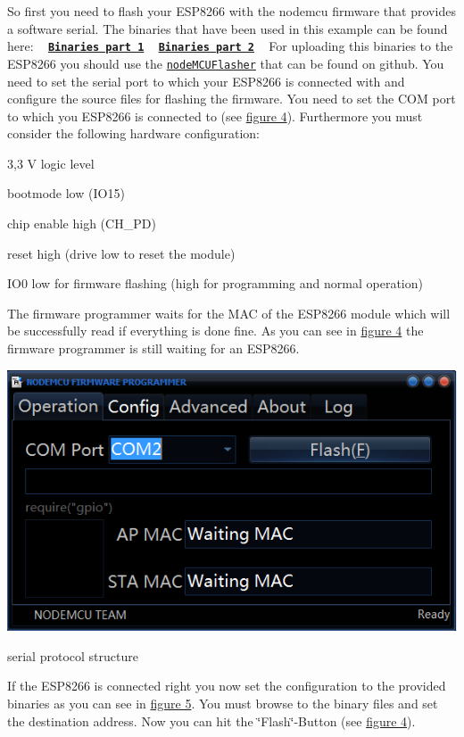  So first you need to flash your E\+S\+P8266 with the nodemcu firmware that provides a software serial. The binaries that have been used in this example can be found here\+: ~\newline
 \href{0x00000.bin}{\tt {\bfseries Binaries part 1}} ~\newline
 \href{0x10000.bin}{\tt {\bfseries Binaries part 2}} ~\newline
 For uploading this binaries to the E\+S\+P8266 you should use the \href{https://github.com/nodemcu/nodemcu-flasher}{\tt node\+M\+C\+U\+Flasher} that can be found on github. You need to set the serial port to which your E\+S\+P8266 is connected with and configure the source files for flashing the firmware. You need to set the C\+O\+M port to which you E\+S\+P8266 is connected to (see \hyperlink{index_four}{figure 4}). Furthermore you must consider the following hardware configuration\+: 
\begin{DoxyItemize}
\item 3,3 V logic level 
\item bootmode low (I\+O15) 
\item chip enable high (C\+H\+\_\+\+P\+D) 
\item reset high (drive low to reset the module) 
\item I\+O0 low for firmware flashing (high for programming and normal operation) 
\end{DoxyItemize}The firmware programmer waits for the M\+A\+C of the E\+S\+P8266 module which will be successfully read if everything is done fine. As you can see in \hyperlink{index_four}{figure 4} the firmware programmer is still waiting for an E\+S\+P8266. \label{index_four}%
\hypertarget{index_four}{}%

\begin{DoxyImage}
\includegraphics[width=\textwidth,height=\textheight/2,keepaspectratio=true]{NodeMCUFlasher_flash.PNG}
\caption{serial protocol structure}
\end{DoxyImage}
If the E\+S\+P8266 is connected right you now set the configuration to the provided binaries as you can see in \hyperlink{index_five}{figure 5}. You must browse to the binary files and set the destination address. Now you can hit the \char`\"{}\+Flash\char`\"{}-\/\+Button (see \hyperlink{index_four}{figure 4}). \label{index_five}%
\hypertarget{index_five}{}%

